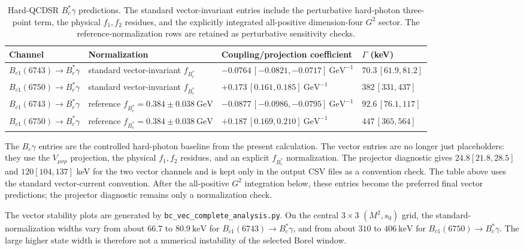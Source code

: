 \documentclass[11pt]{article}
\newcommand{\Bc}{B_c}
\newcommand{\Bcst}{B_c^\ast}
\newcommand{\BcOne}{B_{c1}}
\newcommand{\GeV}{\mathrm{GeV}}
\begin{document}
\begin{table}[h]
\centering
\caption{Hard-QCDSR \(B_c^\ast\gamma\) predictions.  The standard
vector-invariant entries include the perturbative hard-photon three-point term,
the physical \(f_1,f_2\) residues, and the explicitly integrated all-positive
dimension-four \(G^2\) sector.  The reference-normalization rows are retained as
perturbative sensitivity checks.}
\scriptsize
\setlength{\tabcolsep}{3pt}
\begin{tabular}{p{}p{}p{}p{}}
\toprule
Channel & Normalization & Coupling/projection coefficient & \(\Gamma\) (keV)\\
\midrule
\(\BcOne(6743)\to\Bcst\gamma\)
& standard vector-invariant \(f_{\Bcst}\)
& \(-0.0764\,[-0.0821,-0.0717]~\GeV^{-1}\)
& \(70.3\,[61.9,81.2]\)\\
\(\BcOne(6750)\to\Bcst\gamma\)
& standard vector-invariant \(f_{\Bcst}\)
& \(+0.173\,[0.161,0.185]~\GeV^{-1}\)
& \(382\,[331,437]\)\\
\(\BcOne(6743)\to\Bcst\gamma\)
& reference \(f_{\Bcst}=0.384\pm0.038~\GeV\)
& \(-0.0877\,[-0.0986,-0.0795]~\GeV^{-1}\)
& \(92.6\,[76.1,117]\)\\
\(\BcOne(6750)\to\Bcst\gamma\)
& reference \(f_{\Bcst}=0.384\pm0.038~\GeV\)
& \(+0.187\,[0.169,0.210]~\GeV^{-1}\)
& \(447\,[365,564]\)\\
\bottomrule
\end{tabular}
\end{table}

The \(\Bc\gamma\) entries are the controlled hard-photon baseline from the
present calculation.  The vector entries are no longer just placeholders:
they use the \(V_{\mu\nu\rho}\) projection, the physical \(f_1,f_2\) residues,
and an explicit \(f_{\Bcst}\) normalization.  The projector diagnostic gives
\(24.8[21.8,28.5]\) and \(120[104,137]\) keV for the two vector channels and is
kept only in the output CSV files as a convention check.  The table above uses
the standard vector-current convention.  After the all-positive \(G^2\)
integration below, these entries become the preferred final vector predictions;
the projector diagnostic remains only a normalization check.

The vector stability plots are generated by
\texttt{bc\_vec\_complete\_analysis.py}.  On the central \(3\times3\)
\((M^2,s_0)\) grid, the standard-normalization widths vary from about
\(66.7\) to \(80.9~\mathrm{keV}\) for \(\BcOne(6743)\to\Bcst\gamma\), and from about
\(310\) to \(406~\mathrm{keV}\) for \(\BcOne(6750)\to\Bcst\gamma\).  The large higher
state width is therefore not a numerical instability of the selected Borel
window.
\end{document}
